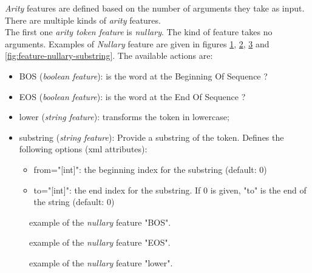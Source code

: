 \documentclass[manual-fr.tex]{subfiles}
\begin{document}
\emph{Arity} features are defined based on the number of arguments they take as input. There are multiple kinds of \emph{arity} features.\\

The first one \emph{arity token feature} is \emph{nullary}. The kind of feature takes no arguments. Examples of \emph{Nullary} feature are given in figures \ref{fig:feature-nullary-BOS}, \ref{fig:feature-nullary-EOS}, \ref{fig:feature-nullary-lower} and \ref{fig:feature-nullary-substring}. The available actions are:
\begin{itemize}
    \item BOS (\textit{boolean feature}): is the word at the Beginning Of Sequence ?
    \item EOS (\textit{boolean feature}): is the word at the End Of Sequence ?
    \item lower (\textit{string feature}): transforms the token in lowercase;
    \item substring (\textit{string feature}): Provide a substring of the token. Defines the following options (xml attributes):
    \begin{itemize}
        \item from="[int]": the beginning index for the substring (default: 0)
        \item to="[int]": the end index for the substring. If 0 is given, "to" is the end of the string (default: 0)
    \end{itemize}
\end{itemize}

\begin{figure}[ht!]
\footnotesize
\begin{xml}
\end{xml}
\caption{example of the \textit{nullary} feature "BOS".}
\label{fig:feature-nullary-BOS}
\end{figure}

\begin{figure}[ht!]
\footnotesize
\begin{xml}
\end{xml}
\caption{example of the \textit{nullary} feature "EOS".}
\label{fig:feature-nullary-EOS}
\end{figure}

\begin{figure}[ht!]
\footnotesize
\begin{xml}
\end{xml}
\caption{example of the \textit{nullary} feature "lower".}
\label{fig:feature-nullary-lower}
\end{figure}
\end{document}
